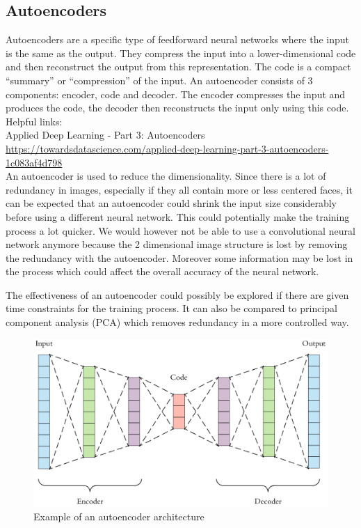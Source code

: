\subsection{Autoencoders}

Autoencoders are a specific type of feedforward neural networks where the input is the same as the output. They compress the input into a lower-dimensional code and then reconstruct the output from this representation. The code is a compact “summary” or “compression” of the input.
An autoencoder consists of 3 components: encoder, code and decoder. The encoder compresses the input and produces the code, the decoder then reconstructs the input only using this code.\\

Helpful links:\\
Applied Deep Learning - Part 3: Autoencoders
\\
\url{https://towardsdatascience.com/applied-deep-learning-part-3-autoencoders-1c083af4d798}\\

An autoencoder is used to reduce the dimensionality. Since there is a lot of redundancy in images, especially if they all contain more or less centered faces, it can be expected that an autoencoder could shrink the input size considerably before using a different neural network. This could potentially make the training process a lot quicker. We would however not be able to use a convolutional neural network anymore because the 2 dimensional image structure is lost by removing the redundancy with the autoencoder. Moreover some information may be lost in the process which could affect the overall accuracy of the neural network. 

The effectiveness of an autoencoder could possibly be explored if there are given time constraints for the training process. It can also be compared to principal component analysis (PCA) which removes redundancy in a more controlled way. 

\begin{figure}[hbtp]
	\centering
	\includegraphics[width=1\textwidth]{Images/Autoencoder}
	\caption{Example of an autoencoder architecture}
\end{figure}





